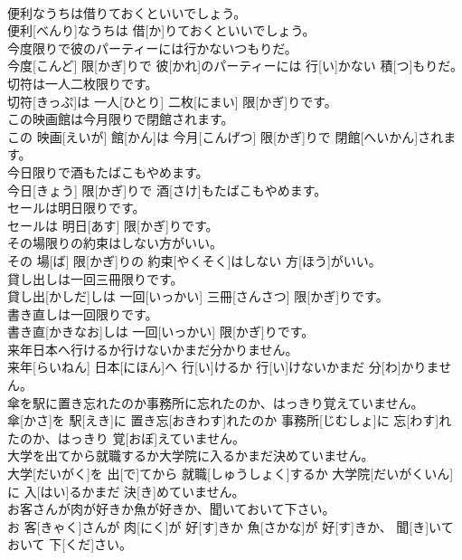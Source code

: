 \documentclass[8pt]{extreport}
\begin{document}
\begin{CJK}{UTF8}{min}
\\	便利なうちは借りておくといいでしょう。	
\\	便利[べんり]なうちは 借[か]りておくといいでしょう。
\\	今度限りで彼のパーティーには行かないつもりだ。	
\\	今度[こんど] 限[かぎ]りで 彼[かれ]のパーティーには 行[い]かない 積[つ]もりだ。
\\	切符は一人二枚限りです。	
\\	切符[きっぷ]は 一人[ひとり] 二枚[にまい] 限[かぎ]りです。
\\	この映画館は今月限りで閉館されます。	
\\	この 映画[えいが] 館[かん]は 今月[こんげつ] 限[かぎ]りで 閉館[へいかん]されます。
\\	今日限りで酒もたばこもやめます。	
\\	今日[きょう] 限[かぎ]りで 酒[さけ]もたばこもやめます。
\\	セールは明日限りです。	
\\	セールは 明日[あす] 限[かぎ]りです。
\\	その場限りの約束はしない方がいい。	
\\	その 場[ば] 限[かぎ]りの 約束[やくそく]はしない 方[ほう]がいい。
\\	貸し出しは一回三冊限りです。	
\\	貸し出[かしだ]しは 一回[いっかい] 三冊[さんさつ] 限[かぎ]りです。
\\	書き直しは一回限りです。	
\\	書き直[かきなお]しは 一回[いっかい] 限[かぎ]りです。
\\	来年日本へ行けるか行けないかまだ分かりません。	
\\	来年[らいねん] 日本[にほん]へ 行[い]けるか 行[い]けないかまだ 分[わ]かりません。
\\	傘を駅に置き忘れたのか事務所に忘れたのか、はっきり覚えていません。	
\\	傘[かさ]を 駅[えき]に 置き忘[おきわす]れたのか 事務所[じむしょ]に 忘[わす]れたのか、はっきり 覚[おぼ]えていません。
\\	大学を出てから就職するか大学院に入るかまだ決めていません。	
\\	大学[だいがく]を 出[で]てから 就職[しゅうしょく]するか 大学院[だいがくいん]に 入[はい]るかまだ 決[き]めていません。
\\	お客さんが肉が好きか魚が好きか、聞いておいて下さい。	
\\	お 客[きゃく]さんが 肉[にく]が 好[す]きか 魚[さかな]が 好[す]きか、 聞[き]いておいて 下[くだ]さい。

\end{CJK}
\end{document}
